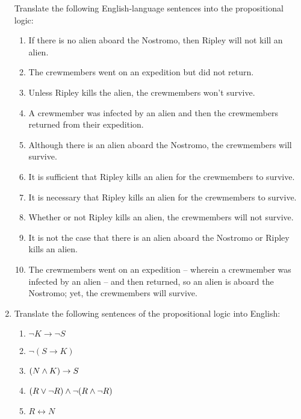 \begin{enumerate}
        Translate the following English-language sentences into the propositional logic:
        \begin{enumerate}
            \item
                If there is no alien aboard the Nostromo,
                then Ripley will not kill an alien.
            \item
                The crewmembers went on an expedition but did not return.
            \item
                Unless Ripley kills the alien, the crewmembers won't survive.
            \item
                A crewmember was infected by an alien
                and then the crewmembers returned from their expedition.
            \item
                Although there is an alien aboard the Nostromo,
                the crewmembers will survive.
            \item
                It is sufficient that Ripley kills an alien
                for the crewmembers to survive.
            \item
                It is necessary that Ripley kills an alien
                for the crewmembers to survive.
            \item
                Whether or not Ripley kills an alien,
                the crewmembers will not survive.
            \item
                It is not the case that
                there is an alien aboard the Nostromo
                or Ripley kills an alien.
            \item
                The crewmembers went on an expedition
                -- wherein a crewmember was infected by an alien --
                and then returned,
                so an alien is aboard the Nostromo;
                yet, the crewmembers will survive.
        \end{enumerate}

    \item \label{prob:3}
        Translate the following sentences of the propositional logic into English:
        \begin{enumerate}
            \item
                \(\neg K \rightarrow \neg S\)
            \item
                \(\neg (S \rightarrow K)\)
            \item
                \((N \wedge K) \rightarrow S\)
            \item
                \((R \vee \neg R) \wedge \neg (R \wedge \neg R)\)
            \item
                \(R \leftrightarrow N\)
        \end{enumerate}
\end{enumerate}

